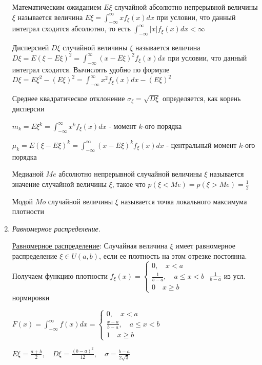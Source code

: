 \documentclass[12pt]{article}
\begin{document}
\begin{enumerate}
    Математическим ожиданием $E\xi$ случайной абсолютно непрерывной величины $\xi$ называется величина $E\xi = \int_{-\infty}^{\infty} xf_\xi(x) dx$ 
    при условии, что данный интеграл сходится абсолютно, то есть $\int_{-\infty}^\infty |x|f_\xi(x)dx < \infty$

    Дисперсией $D\xi$ случайной величины $\xi$ называется величина $D\xi = E(\xi - E\xi)^2 = \int_{-\infty}^\infty (x - E\xi)^2 f_\xi(x) dx$ при условии,
    что данный интеграл сходится. Вычислять удобно по формуле $D\xi = E\xi^2 - (E\xi)^2 = \int_{-\infty}^\infty x^2 f_\xi(x)dx - (E\xi)^2$

    Среднее квадратическое отклонение $\sigma_\xi = \sqrt{D\xi}$ определяется, как корень дисперсии

    $m_k = E\xi^k = \int_{-\infty}^\infty x^k f_\xi(x)dx$ - момент $k$-ого порядка

    $\mu_k = E(\xi - E\xi)^k = \int_{-\infty}^\infty (x - E\xi)^k f_\xi(x)dx$ - центральный момент $k$-ого порядка
    
    Медианой $Me$ абсолютно непрерывной случайной величины $\xi$ называется значение случайной величины $\xi$, такое что $p(\xi < Me) = p(\xi > Me) = \frac{1}{2}$
    
    Модой $Mo$ случайной величины $\xi$ называется точка локального максимума плотности

    \item \textit{Равномерное распределение. }

    \hyperlink{uniformdistribution}{Равномерное распределение}: Случайная величина $\xi$ имеет равномерное распределение $\xi \in U(a, b)$, если ее плотность
    на этом отрезке постоянна. Получаем функцию плотности $f_\xi(x) = \begin{cases}0, \quad x < a \\ \frac{1}{b - a}, \quad a \leq x < b \\ 0 \quad x \geq b\end{cases}$ \hfill {\scriptsize $\frac{1}{b - a}$ из усл. нормировки}

    $F(x) = \int_{-\infty}^\infty f(x)dx = \begin{cases}0, \quad x < a \\ \frac{x - a}{b - a}, \quad a \leq x < b \\ 1 \quad x \geq b\end{cases}$

    $E\xi = \frac{a + b}{2}, \quad D\xi = \frac{(b - a)^2}{12}, \quad \sigma = \frac{b - a}{2\sqrt{3}}$


\end{enumerate}
\end{document}
